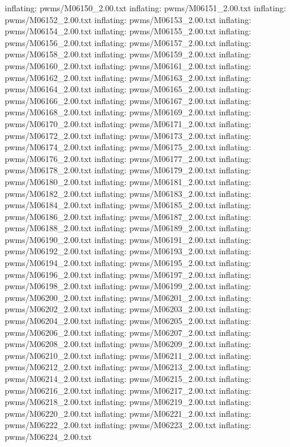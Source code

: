 \documentclass[letterpaper,10pt,english]{sphinxmanual}
\begin{document}
{\begin{sphinxVerbatim}[commandchars=\\\{\}]
  inflating: pwms/M06150\_2.00.txt
  inflating: pwms/M06151\_2.00.txt
  inflating: pwms/M06152\_2.00.txt
  inflating: pwms/M06153\_2.00.txt
  inflating: pwms/M06154\_2.00.txt
  inflating: pwms/M06155\_2.00.txt
  inflating: pwms/M06156\_2.00.txt
  inflating: pwms/M06157\_2.00.txt
  inflating: pwms/M06158\_2.00.txt
  inflating: pwms/M06159\_2.00.txt
  inflating: pwms/M06160\_2.00.txt
  inflating: pwms/M06161\_2.00.txt
  inflating: pwms/M06162\_2.00.txt
  inflating: pwms/M06163\_2.00.txt
  inflating: pwms/M06164\_2.00.txt
  inflating: pwms/M06165\_2.00.txt
  inflating: pwms/M06166\_2.00.txt
  inflating: pwms/M06167\_2.00.txt
  inflating: pwms/M06168\_2.00.txt
  inflating: pwms/M06169\_2.00.txt
  inflating: pwms/M06170\_2.00.txt
  inflating: pwms/M06171\_2.00.txt
  inflating: pwms/M06172\_2.00.txt
  inflating: pwms/M06173\_2.00.txt
  inflating: pwms/M06174\_2.00.txt
  inflating: pwms/M06175\_2.00.txt
  inflating: pwms/M06176\_2.00.txt
  inflating: pwms/M06177\_2.00.txt
  inflating: pwms/M06178\_2.00.txt
  inflating: pwms/M06179\_2.00.txt
  inflating: pwms/M06180\_2.00.txt
  inflating: pwms/M06181\_2.00.txt
  inflating: pwms/M06182\_2.00.txt
  inflating: pwms/M06183\_2.00.txt
  inflating: pwms/M06184\_2.00.txt
  inflating: pwms/M06185\_2.00.txt
  inflating: pwms/M06186\_2.00.txt
  inflating: pwms/M06187\_2.00.txt
  inflating: pwms/M06188\_2.00.txt
  inflating: pwms/M06189\_2.00.txt
  inflating: pwms/M06190\_2.00.txt
  inflating: pwms/M06191\_2.00.txt
  inflating: pwms/M06192\_2.00.txt
  inflating: pwms/M06193\_2.00.txt
  inflating: pwms/M06194\_2.00.txt
  inflating: pwms/M06195\_2.00.txt
  inflating: pwms/M06196\_2.00.txt
  inflating: pwms/M06197\_2.00.txt
  inflating: pwms/M06198\_2.00.txt
  inflating: pwms/M06199\_2.00.txt
  inflating: pwms/M06200\_2.00.txt
  inflating: pwms/M06201\_2.00.txt
  inflating: pwms/M06202\_2.00.txt
  inflating: pwms/M06203\_2.00.txt
  inflating: pwms/M06204\_2.00.txt
  inflating: pwms/M06205\_2.00.txt
  inflating: pwms/M06206\_2.00.txt
  inflating: pwms/M06207\_2.00.txt
  inflating: pwms/M06208\_2.00.txt
  inflating: pwms/M06209\_2.00.txt
  inflating: pwms/M06210\_2.00.txt
  inflating: pwms/M06211\_2.00.txt
  inflating: pwms/M06212\_2.00.txt
  inflating: pwms/M06213\_2.00.txt
  inflating: pwms/M06214\_2.00.txt
  inflating: pwms/M06215\_2.00.txt
  inflating: pwms/M06216\_2.00.txt
  inflating: pwms/M06217\_2.00.txt
  inflating: pwms/M06218\_2.00.txt
  inflating: pwms/M06219\_2.00.txt
  inflating: pwms/M06220\_2.00.txt
  inflating: pwms/M06221\_2.00.txt
  inflating: pwms/M06222\_2.00.txt
  inflating: pwms/M06223\_2.00.txt
  inflating: pwms/M06224\_2.00.txt

\end{sphinxVerbatim}}
\end{document}

